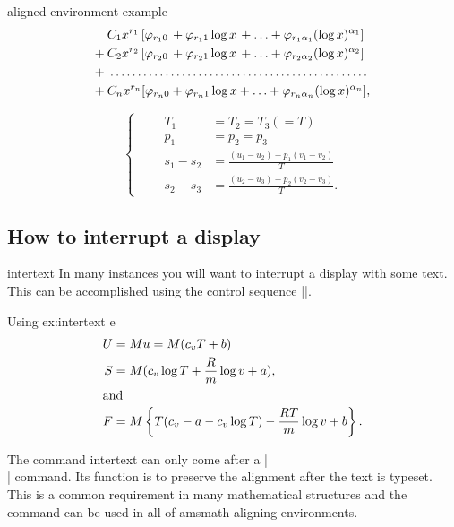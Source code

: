 \begin{texexample}{aligned environment example}{}
\begin{equation}
\begin{aligned}
  &\:C_1x^{r_1}\,[\varphi_{r_1 0} \,+ \varphi_{r_1 1}\log x \,+ \dotsb + \varphi_{r_1 \alpha_1}(\log x)^{\alpha_1}]\\
+ &\:C_2x^{r_2}\,[\varphi_{r_2 0} \,+ \varphi_{r_2 1}\log x \,+ \dotsb + \varphi_{r_2 \alpha_2}(\log x)^{\alpha_2}]\\
+ &\multispan{1}{\:\dotfill}\\
+ &\:C_nx^{r_n}[\varphi_{r_n 0} + \varphi_{r_n 1}\log x + \dotsb + \varphi_{r_n \alpha_n}(\log x)^{\alpha_n}],
\end{aligned}
\end{equation}

\[
\tag{98}
\left\{\qquad
\begin{aligned}
T_1 &= T_2 = T_3 (=T)\\
p_1 &= p_2 = p_3\\
s_1-s_2 &= \frac{(u_1-u_2)+p_1(v_1-v_2)}{T}\\
s_2-s_3 &= \frac{(u_2-u_3)+p_2(v_2-v_3)}{T}.
\end{aligned}
\right.
\]
\end{texexample}




\subsection{How to interrupt a display}

\begin{docCommand}{intertext}{}
 In many instances you will want to interrupt a display with some text. This can be accomplished using the control sequence |\intertext|.
 \end{docCommand}
 
 

\begin{texexample}{Using }{ex:intertext}
e
\begin{align}
U &= M u = M(c_v T + b)\\
S &= M(c_v  \log T + \frac{R}{m}  \log v + a),\\
\intertext{and}
F &= M \left\{T(c_v - a - c_v \log T) - \frac{RT}{m} \log v + b \right\}.
\end{align}
\end{texexample}

The command intertext can only come after a |\\|  command. Its function is to preserve the alignment after the text is typeset. This is a common requirement in many mathematical 
structures and the command can be used in all of amsmath aligning environments.






